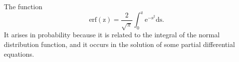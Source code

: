 The function 
\[ \mathrm{erf(z)} 
= \frac{2}{\sqrt{\pi}} \int _0 ^{\mathrm{z}} \mathrm{e}^{- \mathrm{s}^2} \mathrm{ds} .\]
It arises in probability because it is related to the integral of the 
normal distribution function, and it occurs in the solution of some 
partial differential equations.